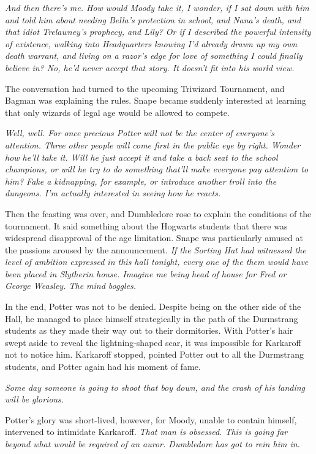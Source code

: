 \emph{And then there's me. How would Moody take it, I wonder, if I sat down with him and told him about needing Bella's protection in school, and Nana's death, and that idiot Trelawney's prophecy, and Lily? Or if I described the powerful intensity of existence, walking into Headquarters knowing I'd already drawn up my own death warrant, and living on a razor's edge for love of something I could finally believe in? No, he'd never accept that story. It doesn't fit into his world view.}

The conversation had turned to the upcoming Triwizard Tournament, and Bagman was explaining the rules. Snape became suddenly interested at learning that only wizards of legal age would be allowed to compete.

\emph{Well, well. For once precious Potter will not be the center of everyone's attention. Three other people will come first in the public eye by right. Wonder how he'll take it. Will he just accept it and take a back seat to the school champions, or will he try to do something that'll make everyone pay attention to him? Fake a kidnapping, for example, or introduce another troll into the dungeons. I'm actually interested in seeing how he reacts.}

Then the feasting was over, and Dumbledore rose to explain the conditions of the tournament. It said something about the Hogwarts students that there was widespread disapproval of the age limitation. Snape was particularly amused at the passions aroused by the announcement. \emph{If the Sorting Hat had witnessed the level of ambition expressed in this hall tonight, every one of the them would have been placed in Slytherin house. Imagine me being head of house for Fred or George Weasley. The mind boggles.}

In the end, Potter was not to be denied. Despite being on the other side of the Hall, he managed to place himself strategically in the path of the Durmstrang students as they made their way out to their dormitories. With Potter's hair swept aside to reveal the lightning-shaped scar, it was impossible for Karkaroff not to notice him. Karkaroff stopped, pointed Potter out to all the Durmstrang students, and Potter again had his moment of fame.

\emph{Some day someone is going to shoot that boy down, and the crash of his landing will be glorious.}

Potter's glory was short-lived, however, for Moody, unable to contain himself, intervened to intimidate Karkaroff. \emph{That man is obsessed. This is going far beyond what would be required of an auror. Dumbledore has got to rein him in.}

